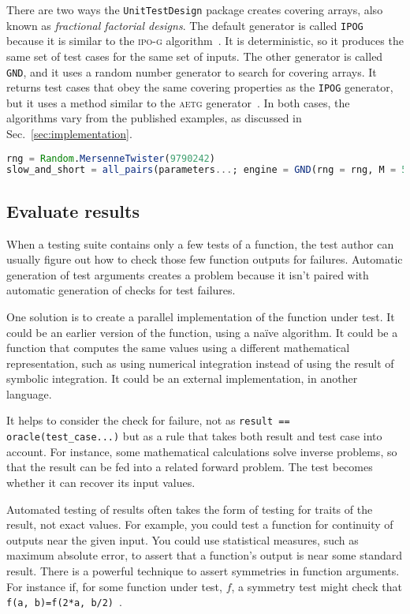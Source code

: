 \documentclass{juliacon}
\newcommand{\utd}{\texttt{UnitTestDesign}\xspace}
\begin{document}
\vskip 6pt
There are two ways the \utd package creates covering arrays, also known as \emph{fractional factorial designs}. The default generator is called \verb|IPOG| because it is similar to the \textsc{ipo-g} algorithm~\cite{Lei2008-xt}. It is deterministic, so it produces the same set of test cases for the same set of inputs. The other generator is called \verb|GND|, and it uses a random number generator to search for covering arrays. It returns test cases that obey the same covering properties as the \verb|IPOG| generator, but it uses a method similar to the \textsc{aetg} generator~\cite{Cohen1997-lb}. In both cases, the algorithms vary from the published examples, as discussed in Sec.~\ref{sec:implementation}.

\begin{lstlisting}[language=Julia]
rng = Random.MersenneTwister(9790242)
slow_and_short = all_pairs(parameters...; engine = GND(rng = rng, M = 50))
\end{lstlisting}

\subsection{Evaluate results}

When a testing suite contains only a few tests of a function, the test author can usually figure out how to check those few function outputs for failures. Automatic generation of test arguments creates a problem because it isn't paired with automatic generation of checks for test failures.

\vskip 6pt
One solution is to create a parallel implementation of the function under test. It could be an earlier version of the function, using a na{\"i}ve algorithm. It could be a function that computes the same values using a different mathematical representation, such as using numerical integration instead of using the result of symbolic integration. It could be an external implementation, in another language.

\vskip 6pt
It helps to consider the check for failure, not as \verb|result == oracle(test_case...)| but as a rule that takes both result and test case into account. For instance, some mathematical calculations solve inverse problems, so that the result can be fed into a related forward problem. The test becomes whether it can recover its input values.

\vskip 6pt
Automated testing of results often takes the form of testing for traits of the result, not exact values. For example, you could test a function for continuity of outputs near the given input. You could use statistical measures, such as maximum absolute error, to assert that a function's output is near some standard result. There is a powerful technique to assert symmetries in function arguments. For instance if, for some function under test, $f$, a symmetry test might check that \verb|f(a, b)=f(2*a, b/2)|~\cite{Segura2016-qh}.
\end{document}
